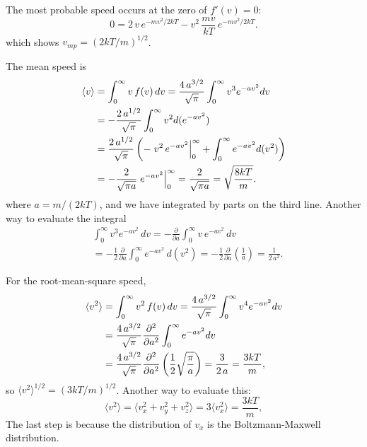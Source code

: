 \documentclass[twocolumn, 10pt]{article}
\numberwithin{equation}{section}
\newenvironment{solution}[1][\empty]
{\par\medskip
  \textbf{\ifx\empty#1{Solution.}\relax\else{#1}\fi} \ignorespaces}
{\medskip}
\begin{document}
\begin{solution}
The most probable speed
occurs at the zero of $f'(v) = 0$:
$$
0 =
  2 \, v \, e^{-mv^2/2kT}
  -v^2 \, \frac{mv}{kT} \, e^{-mv^2/2kT}.
$$
which shows $v_{mp} = (2kT/m)^{1/2}$.

The mean speed is
\begin{align}
  \langle v \rangle
  &=
  \int_0^\infty v \, f(v) \, dv
  =
  \frac{4 \, a^{3/2}}{\sqrt\pi}
  \int_0^\infty
    v^3 e^{-av^2} dv
  \notag
  \\
  &=
  -\frac{2 \, a^{1/2}}{\sqrt\pi}
  \int_0^\infty
    v^2 d(e^{-av^2})
  \notag
  \\
  &=
  \frac{2 \, a^{1/2}}{\sqrt\pi}
  \left(
  -\left. v^2 \, e^{-av^2} \right|_0^\infty
  +
  \int_0^\infty
    e^{-av^2} d(v^2)
  \right)
  \notag
  \\
  &=
  -\frac{2}{\sqrt{\pi a}}
  \left.  e^{-av^2}\right|_0^\infty
  =
  \frac{2}{\sqrt{\pi a}}
  =
    \sqrt{ \frac{8kT}{m} }
  .
  \label{eq:absv_ave}
\end{align}
where $a = m/(2kT)$,
and we have integrated by parts
on the third line.
%
Another way to evaluate the integral
%
\begin{align*}
  &\int_0^\infty
    v^3 e^{-av^2} \, dv
  =
  -\frac{\partial}{\partial a}
  \int_0^\infty
    v \, e^{-av^2} \, dv
  \\
  &=
  -\frac{1}{2}
  \frac{\partial}{\partial a}
  \int_0^\infty
    e^{-av^2} \, d(v^2)
  =
  -\frac{1}{2}
  \frac{\partial}{\partial a}
    \left(  \frac{1}{a} \right)
  =\frac{1}{2 \, a^2}.
\end{align*}

For the root-mean-square speed,
\begin{align}
  \langle v^2 \rangle
  &=
  \int_0^\infty v^2 \, f(v) \, dv
  =
  \frac{4 \, a^{3/2}}{\sqrt\pi}
  \int_0^\infty
    v^4 e^{-av^2} dv
  \notag \\
  &=
  \frac{4 \, a^{3/2}}{\sqrt\pi}
    \frac{ \partial^2 } { \partial a^2 }
  \int_0^\infty
    e^{-av^2} d v
  \notag \\
  &=
  \frac{4 \, a^{3/2}}{\sqrt\pi}
    \frac{ \partial^2 } { \partial a^2 }
    \left( \frac{1}{2} \sqrt{ \frac{ \pi } { a } } \right)
  =
  \frac{3}{2 \, a}
  =
  \frac{3kT}{m}
  ,
  \label{eq:v2_ave}
\end{align}
so $\langle v^2 \rangle^{1/2} = (3kT/m)^{1/2}$.
%
Another way to evaluate this:
$$
\langle v^2 \rangle
=
\langle v_x^2 + v_y^2 + v_z^2 \rangle
=
3 \langle v_x^2 \rangle
=
\frac{ 3 k T } { m },
$$
The last step is because
the distribution of $v_x$
is the Boltzmann-Maxwell distribution.


\end{solution}
\end{document}
